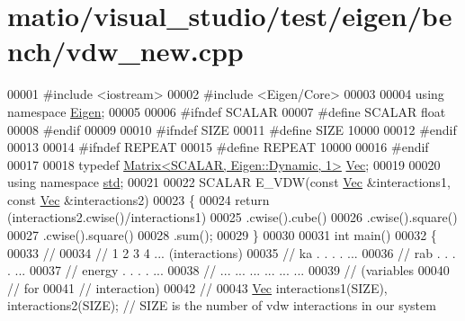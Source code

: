 \hypertarget{matio_2visual__studio_2test_2eigen_2bench_2vdw__new_8cpp_source}{}\section{matio/visual\+\_\+studio/test/eigen/bench/vdw\+\_\+new.cpp}
\label{matio_2visual__studio_2test_2eigen_2bench_2vdw__new_8cpp_source}

\begin{DoxyCode}
00001 \textcolor{preprocessor}{#include <iostream>}
00002 \textcolor{preprocessor}{#include <Eigen/Core>}
00003 
00004 \textcolor{keyword}{using namespace }\hyperlink{namespace_eigen}{Eigen};
00005 
00006 \textcolor{preprocessor}{#ifndef SCALAR}
00007 \textcolor{preprocessor}{#define SCALAR float}
00008 \textcolor{preprocessor}{#endif}
00009 
00010 \textcolor{preprocessor}{#ifndef SIZE}
00011 \textcolor{preprocessor}{#define SIZE 10000}
00012 \textcolor{preprocessor}{#endif}
00013 
00014 \textcolor{preprocessor}{#ifndef REPEAT}
00015 \textcolor{preprocessor}{#define REPEAT 10000}
00016 \textcolor{preprocessor}{#endif}
00017 
00018 \textcolor{keyword}{typedef} \hyperlink{group___core___module_class_eigen_1_1_matrix}{Matrix<SCALAR, Eigen::Dynamic, 1>} \hyperlink{group___core___module_class_eigen_1_1_matrix}{Vec};
00019 
00020 \textcolor{keyword}{using namespace }\hyperlink{namespacestd}{std};
00021 
00022 SCALAR E\_VDW(\textcolor{keyword}{const} \hyperlink{group___core___module_class_eigen_1_1_matrix}{Vec} &interactions1, \textcolor{keyword}{const} \hyperlink{group___core___module_class_eigen_1_1_matrix}{Vec} &interactions2)
00023 \{
00024   \textcolor{keywordflow}{return} (interactions2.cwise()/interactions1)
00025          .cwise().cube()
00026          .cwise().square()
00027          .cwise().square()
00028          .sum();
00029 \}
00030 
00031 \textcolor{keywordtype}{int} main() 
00032 \{
00033   \textcolor{comment}{//}
00034   \textcolor{comment}{//          1   2   3   4  ... (interactions)}
00035   \textcolor{comment}{// ka       .   .   .   .  ...}
00036   \textcolor{comment}{// rab      .   .   .   .  ...}
00037   \textcolor{comment}{// energy   .   .   .   .  ...}
00038   \textcolor{comment}{// ...     ... ... ... ... ...}
00039   \textcolor{comment}{// (variables}
00040   \textcolor{comment}{//    for}
00041   \textcolor{comment}{// interaction)}
00042   \textcolor{comment}{//}
00043   \hyperlink{group___core___module_class_eigen_1_1_matrix}{Vec} interactions1(SIZE), interactions2(SIZE); \textcolor{comment}{// SIZE is the number of vdw interactions in our system}

\end{DoxyCode}
